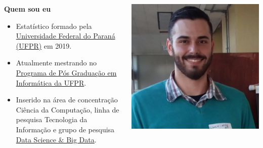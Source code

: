 \documentclass[10pt,
  aspectratio=169,
  serif,
  mathserif,
  professionalfont,
  compress,
  handout,
  ]{beamer}\usepackage[]{graphicx}\usepackage[]{color}
\begin{document}
\begin{frame}

\begin{columns}
\begin{column}{0.7\textwidth}
   
   \textbf{Quem sou eu}
   
   \begin{itemize}

  \item Estatístico formado pela \href{https://www.ufpr.br/portalufpr/}{Universidade Federal do Paraná (UFPR)} em 2019.

  \item Atualmente mestrando no \href{http://www.prppg.ufpr.br/ppginformatica/?lang=pb}{Programa de Pós Graduação em Informática da UFPR}.
  
  \item Inserido na área de concentração Ciência da Computação, linha de pesquisa Tecnologia da Informação e grupo de pesquisa \href{https://web.inf.ufpr.br/dsbd/}{Data Science \& Big Data}.
  
  \end{itemize}
  
\end{column}
\begin{column}{0.3\textwidth}  %
    \begin{center}
     \includegraphics[width=\textwidth]{img/eu3.jpeg}
     \end{center}
\end{column}
\end{columns}
\end{frame}
\end{document}
